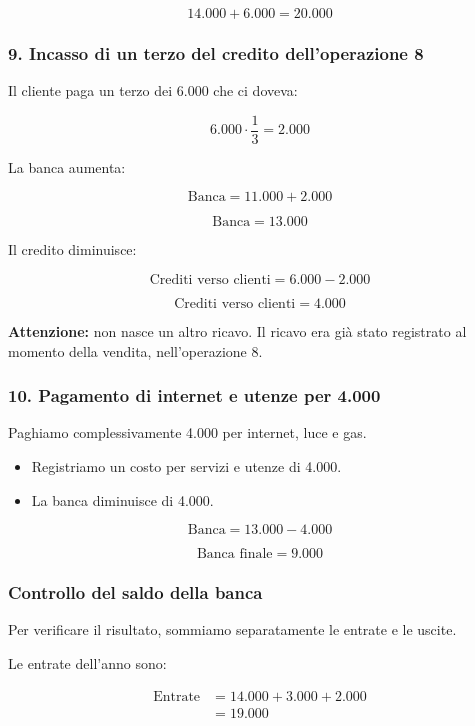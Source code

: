 \[
14.000+6.000=\boxed{20.000}
\]

\subsubsection*{9. Incasso di un terzo del credito
dell'operazione 8}

\noindent Il cliente paga un terzo dei 6.000
che ci doveva:

\[
6.000\cdot\frac{1}{3}=2.000
\]

\noindent La banca aumenta:

\[
\text{Banca}=11.000+2.000
\]

\[
\boxed{\text{Banca}=13.000}
\]

\noindent Il credito diminuisce:

\[
\text{Crediti verso clienti}=6.000-2.000
\]

\[
\boxed{\text{Crediti verso clienti}=4.000}
\]

\noindent \textbf{Attenzione:} non nasce un altro ricavo.
Il ricavo era già stato registrato al momento
della vendita, nell'operazione 8.

\subsubsection*{10. Pagamento di internet e utenze
per 4.000}

\noindent Paghiamo complessivamente 4.000
per internet, luce e gas.

\begin{itemize}
    \item Registriamo un costo per servizi
    e utenze di 4.000.
    \item La banca diminuisce di 4.000.
\end{itemize}

\[
\text{Banca}=13.000-4.000
\]

\[
\boxed{\text{Banca finale}=9.000}
\]

\subsubsection*{Controllo del saldo della banca}

\noindent Per verificare il risultato,
sommiamo separatamente le entrate e le uscite.

\noindent Le entrate dell'anno sono:

\[
\begin{aligned}
\text{Entrate}
&=14.000+3.000+2.000\\
&=\boxed{19.000}
\end{aligned}
\]

